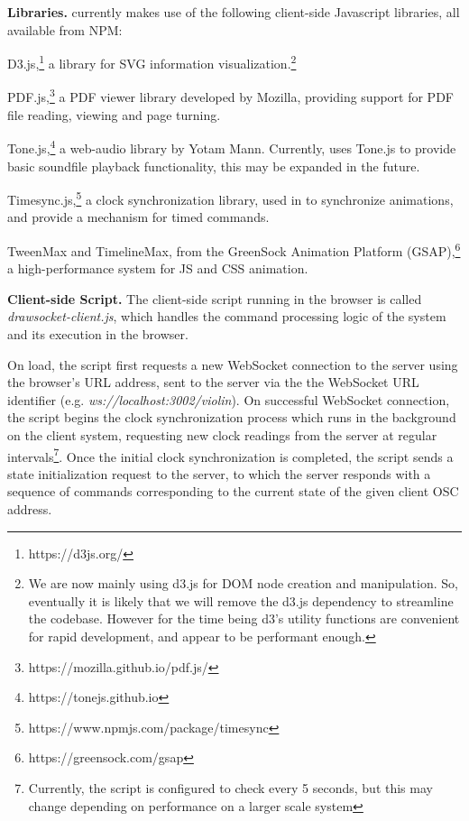 \medskip
\noindent
\textbf{Libraries.}
\drawsocket currently makes use of the following client-side Javascript libraries, all available from NPM:

{D3.js},\footnote{https://d3js.org/} a library for SVG information visualization.\footnote{We are now mainly using d3.js for DOM node creation and manipulation. So, eventually it is likely that we will remove the d3.js dependency to streamline the codebase. However for the time being d3's utility functions are convenient for rapid development, and appear to be performant enough.}

{PDF.js},\footnote{https://mozilla.github.io/pdf.js/} a PDF viewer library developed by Mozilla, providing support for PDF file reading, viewing and page turning.

{Tone.js},\footnote{https://tonejs.github.io} a web-audio library by Yotam Mann. Currently, \drawsocket uses Tone.js to provide basic soundfile playback functionality, this may be expanded in the future.

{Timesync.js},\footnote{https://www.npmjs.com/package/timesync} a clock synchronization library, used in \drawsocket to synchronize animations, and provide a mechanism for timed commands.

 {TweenMax} and {TimelineMax}, from the GreenSock Animation Platform (GSAP),\footnote{https://greensock.com/gsap} a high-performance system for JS and CSS animation.
%
%

\medskip
\noindent
\textbf{Client-side Script.} 
The client-side script running in the browser is called \textit{drawsocket-client.js}, which handles the command processing logic of the system and its execution in the browser.

On load, the script first requests a new WebSocket connection to the server using the browser's URL address, sent to the server via the the WebSocket URL identifier (e.g. \textit{ws://localhost:3002/violin}). On successful WebSocket connection, the script begins the clock synchronization process which runs in the background on the client system, requesting new clock readings from the server at regular intervals\footnote{Currently, the script is configured to check every 5 seconds, but this may change depending on performance on a larger scale system}. Once the initial clock synchronization is completed, the script sends a state initialization request to the server, to which the server responds with a sequence of commands corresponding to the current state of the given client OSC address.

